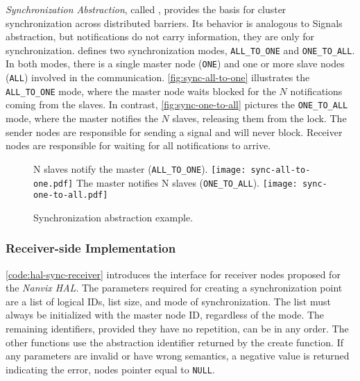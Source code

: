 			\textit{Synchronization Abstraction}, called \sync, provides the
			basis for cluster synchronization across distributed barriers.
			Its behavior is analogous to \posix Signals abstraction, but
			notifications do not carry information, they are only for synchronization.
			\sync defines two synchronization modes, \texttt{ALL\_TO\_ONE} and
			\texttt{ONE\_TO\_ALL}. In both modes, there is a single master node
			(\texttt{ONE}) and one or more slave nodes
			(\texttt{ALL}) involved in the communication. \autoref{fig:sync-all-to-one} illustrates the
			\texttt{ALL\_TO\_ONE} mode, where the master node waits blocked for
			the $N$ notifications coming from the slaves. In contrast,
			\autoref{fig:sync-one-to-all} pictures the \texttt{ONE\_TO\_ALL} mode,
			where the master notifies the $N$ slaves, releasing them from the lock.
			The sender nodes are responsible for sending a signal and will never
			block. Receiver nodes are responsible for waiting for all notifications
			to arrive.

			\begin{figure}[!b]
				\centering%
				\caption{Synchronization abstraction example.}%
				\label{fig:sync-concepts}%

					{N slaves notify the master (\texttt{ALL\_TO\_ONE}).}%
					{\texttt{[image: sync-all-to-one.pdf]}}%
				\hfill%
					{The master notifies N slaves (\texttt{ONE\_TO\_ALL}).}%
					{\texttt{[image: sync-one-to-all.pdf]}}%

			\end{figure}

			\subsubsection{Receiver-side Implementation}

				\autoref{code:hal-sync-receiver} introduces the \sync interface for
				receiver nodes proposed for the \textit{Nanvix HAL}. The parameters required
				for creating a synchronization point are a list of logical IDs, list size,
				and mode of synchronization. The list must always be initialized
				with the master node ID, regardless of the mode. The remaining identifiers,
				provided they have no repetition, can be in any order. The other
				functions use the abstraction identifier returned by the create
				function. If any parameters are invalid or have wrong
				semantics, a
				negative value is returned indicating the error, \eg nodes pointer
				equal to \texttt{NULL}.

